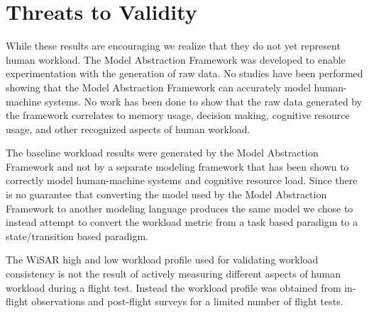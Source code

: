\section{Threats to Validity}

While these results are encouraging we realize that they do not yet represent human workload.  The Model Abstraction Framework was developed to enable experimentation with the generation of raw data.  No studies have been performed showing that the Model Abstraction Framework can accurately model human-machine systems.  No work has been done to show that the raw data generated by the framework correlates to memory usage, decision making, cognitive resource usage, and other recognized aspects of human workload.

The baseline workload results were generated by the Model Abstraction Framework and not by a separate modeling framework that has been shown to correctly model human-machine systems and cognitive resource load.  Since there is no guarantee that converting the model used by the Model Abstraction Framework to another modeling language produces the same model we chose to instead attempt to convert the workload metric from a task based paradigm to a state/transition based paradigm.

The WiSAR high and low workload profile used for validating workload consistency is not the result of actively measuring different aspects of human workload during a flight test.  Instead the workload profile was obtained from in-flight observations and post-flight surveys for a limited number of flight tests.

